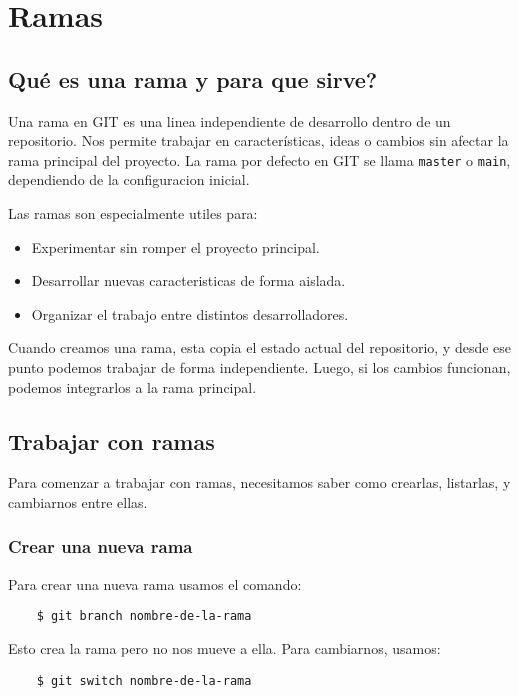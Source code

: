 \section{Ramas}

    \subsection{Qu\'e es una rama y para que sirve?}
        Una rama en GIT es una linea independiente de desarrollo dentro de un repositorio. Nos permite trabajar en caracter\'isticas, ideas o cambios sin afectar la rama principal del proyecto. La rama por defecto en GIT se llama \texttt{master} o \texttt{main}, dependiendo de la configuracion inicial.

        Las ramas son especialmente utiles para:
        \begin{itemize}
            \item Experimentar sin romper el proyecto principal.
            \item Desarrollar nuevas caracteristicas de forma aislada.
            \item Organizar el trabajo entre distintos desarrolladores.
        \end{itemize}

        Cuando creamos una rama, esta copia el estado actual del repositorio, y desde ese punto podemos trabajar de forma independiente. Luego, si los cambios funcionan, podemos integrarlos a la rama principal.

    \subsection{Trabajar con ramas}
        Para comenzar a trabajar con ramas, necesitamos saber como crearlas, listarlas, y cambiarnos entre ellas.

        \subsubsection{Crear una nueva rama}
            Para crear una nueva rama usamos el comando:
            \begin{lstlisting}
    $ git branch nombre-de-la-rama
            \end{lstlisting}

            Esto crea la rama pero no nos mueve a ella. Para cambiarnos, usamos:

            \begin{lstlisting}
    $ git switch nombre-de-la-rama
            \end{lstlisting}

